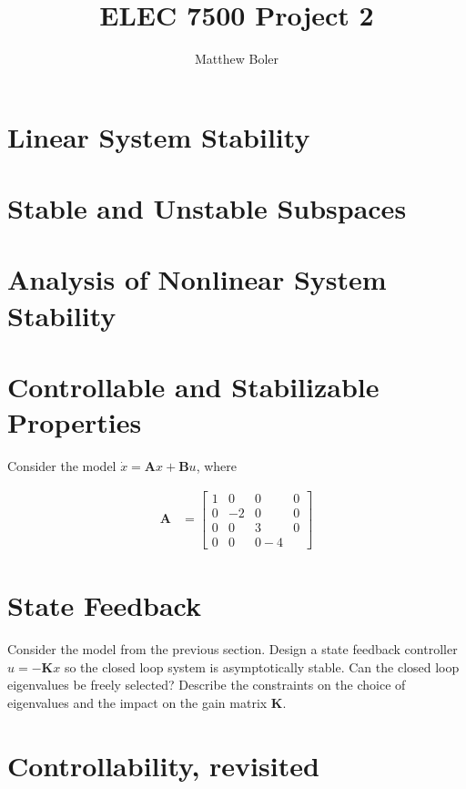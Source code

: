 \documentclass[]{article}
\title{ELEC 7500 Project 2}
\author{Matthew Boler}
\begin{document}
\maketitle

\section{Linear System Stability}

\section{Stable and Unstable Subspaces}

\section{Analysis of Nonlinear System Stability}

\section{Controllable and Stabilizable Properties}

Consider the model $\dot{x} = \mathbf{A}x + \mathbf{B}u$, where

\begin{align*}
	\mathbf{A} &= \begin{bmatrix}
	1 & 0 & 0 & 0 \\
	0 & -2 & 0 & 0 \\
	0 & 0 & 3 & 0 \\
	0 & 0 & 0 -4
	\end{bmatrix}
\end{align*}

\section{State Feedback}

Consider the model from the previous section.
Design a state feedback controller $u = -\mathbf{K}x$ so the closed loop system is asymptotically stable.
Can the closed loop eigenvalues be freely selected?
Describe the constraints on the choice of eigenvalues and the impact on the gain matrix $\mathbf{K}$.

\section{Controllability, revisited}
\end{document}
